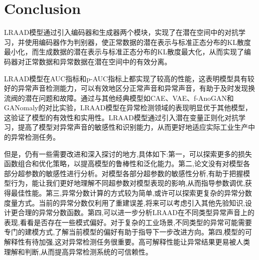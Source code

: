 \documentclass{article}
\begin{document}
\section{Conclusion}
 LRAAD模型通过引入编码器和生成器两个模块，实现了在潜在空间中的对抗学习，并使用编码器作为判别器，使正常数据的潜在表示与标准正态分布的KL散度最小化，而生成数据的潜在表示与标准正态分布的KL散度最大化，从而实现了编码器对正常数据和异常数据在潜在空间中的有效分离。

 LRAAD模型在AUC指标和p-AUC指标上都实现了较高的性能，这表明模型具有较好的异常声音检测能力，可以有效地区分正常声音和异常声音，有助于及时发现换流阀的潜在问题和故障。通过与其他经典模型如CAE、VAE、f-AnoGAN和GANomaly的对比实验，LRAAD模型在异常检测领域的表现明显优于其他模型，这验证了模型的有效性和实用性。LRAAD模型通过引入潜在变量正则化对抗学习，提高了模型对异常声音的敏感性和识别能力，从而更好地适应实际工业生产中的异常检测任务。

 但是，仍有一些需要改进和深入探讨的地方,具体如下:第一，可以探索更多的损失函数组合和优化策略，以提高模型的鲁棒性和泛化能力。第二,论文没有对模型各部分超参数的敏感性进行分析。对模型各部分超参数的敏感性分析,有助于把握模型行为，能让我们更好地理解不同超参数对模型表现的影响,从而指导参数调优,获得最佳性能。第三,异常分数计算的方式较为简单,或许可以探索更复杂的异常分数度量方式。当前的异常分数仅利用了重建误差,将来可以考虑引入其他先验知识,设计更合理的异常分数函数。第四,可以进一步分析LRAAD在不同类型异常声音上的表现,看看是否存在一些模式偏好。对于复杂的工业场景,不同类型的异常可能需要专门的建模方式,了解当前模型的偏好有助于指导下一步改进方向。第四,模型的可解释性有待加强,这对异常检测任务很重要。高可解释性能让异常结果更易被人类理解和判断,从而提高异常检测系统的可信赖性。


\end{document}

